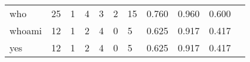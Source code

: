 \begin{longtable}{lp{1.2cm}p{1.2cm}p{1.2cm}p{1.2cm}p{1.2cm}p{1.2cm}p{1.2cm}p{1.2cm}p{1.2cm}p{1.2cm}}
who       &                                    25 &                                                  1 &                                                  4 &                                                  3 &                                                  2 &                                                 15 &                                         0.760 &                                              0.960 &                                              0.600 \\
whoami    &                                    12 &                                                  1 &                                                  2 &                                                  4 &                                                  0 &                                                  5 &                                         0.625 &                                              0.917 &                                              0.417 \\
yes       &                                    12 &                                                  1 &                                                  2 &                                                  4 &                                                  0 &                                                  5 &                                         0.625 &                                              0.917 &                                              0.417 \\
\end{longtable}
